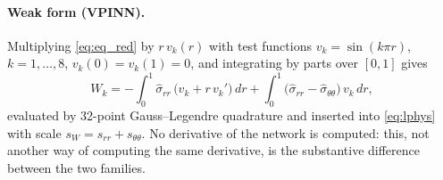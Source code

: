 \documentclass[subscriptcorrection,upint,varvw,barcolor=Goldenrod3,mathalfa=cal=euler,balance,hyphenate,french,pdf-a]{asmejour} %
\begin{document}
\paragraph{Weak form (VPINN).}
Multiplying \eqref{eq:eq_red} by $r\,v_k(r)$ with test functions
$v_k=\sin(k\pi r)$, $k=1,\dots,8$, $v_k(0)=v_k(1)=0$, and integrating by parts over
$[0,1]$ gives \citep{kharazmi2021}
\begin{equation}
  W_k = -\int_0^1 \hat\sigma_{rr}\,\bigl(v_k + r\,v_k'\bigr)\,dr
        + \int_0^1 \bigl(\hat\sigma_{rr}-\hat\sigma_{\theta\theta}\bigr)\,v_k\,dr ,
  \label{eq:weak}
\end{equation}
evaluated by 32-point Gauss--Legendre quadrature and inserted into
\eqref{eq:lphys} with scale $s_W=s_{rr}+s_{\theta\theta}$.
No derivative of the network is computed: this, not another way of computing the
same derivative, is the substantive difference between the two families.
\end{document}
